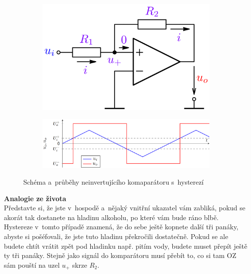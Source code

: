 \documentclass[a4paper,12pt]{article}   %
\begin{document}
\begin{figure}[h!]
    \centering
    \begin{subfigure}{.3\textwidth}
        \centering
        \includegraphics[width=\textwidth]{komparator-noninvert.PNG}
    \end{subfigure}
    \begin{subfigure}{.65\textwidth}
        \centering
        \includegraphics[width=\textwidth]{komparator-noninvert-graf.PNG}
    \end{subfigure}
    \caption{Schéma a~průběhy neinvertujícího komaparátoru s~hysterezí}
    \label{fig:neinvert:komp}
\end{figure}

\textbf{Analogie ze života}\\
Představte si, že jste v~hospodě a~nějaký vnitřní ukazatel vám zabliká, pokud se akorát tak dostanete na hladinu alkoholu, po které vám bude ráno blbě. Hystereze v~tomto případě znamená, že do sebe ještě kopnete další tři panáky, abyste si pošéfovali, že jste tuto hladinu překročili dostatečně. Pokud se ale budete chtít vrátit zpět pod hladinku např. pitím vody, budete muset přepít ještě ty tři panáky. Stejně jako signál do komparátoru musí přebít to, co si tam OZ sám pouští na uzel $u_+$ skrze $R_2$.
\end{document}
